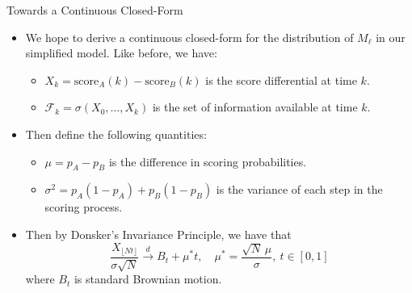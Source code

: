 \documentclass{beamer}
\begin{document}
\begin{frame}{Towards a Continuous Closed-Form}
  \begin{itemize}
     \item We hope to derive a continuous closed-form for the distribution of $M_\ell$ in our simplified model. Like before, we have:
     \pause
     \begin{itemize}
      \item $X_k = \text{score}_A(k) - \text{score}_B(k)$ is the score differential at time $k$.
      \pause
      \item $\mathcal{F}_k = \sigma(X_0, \ldots, X_k)$ is the set of information available at time $k$.
     \end{itemize}
     \pause
     \item Then define the following quantities:
     \pause
     \begin{itemize}
      \item $\mu = p_A - p_B$ is the difference in scoring probabilities.
      \pause
      \item $\sigma^2 = p_A(1-p_A) + p_B(1-p_B)$ is the variance of each step in the scoring process.
     \end{itemize}
     \pause
     \item Then by Donsker's Invariance Principle, we have that
     \begin{equation*}
      \frac{X_{\lfloor Nt \rfloor}}{\sigma \sqrt{N}} \xrightarrow{d} B_t + \mu^* t,\quad \mu^* = \frac{\sqrt{N}\,\mu}{\sigma},\ t \in [0,1]
     \end{equation*}
     where $B_t$ is standard Brownian motion.
  \end{itemize}
\end{frame}
\end{document}
